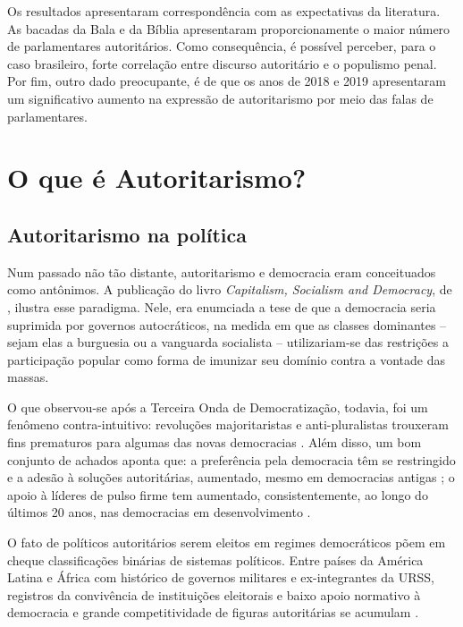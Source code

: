 \documentclass[
12pt,				%
openright,			%
twoside,			%
a4paper,			%
english,			%
french,				%
spanish,			%
brazil				%
]{abntex2}
\begin{document}
Os resultados apresentaram correspondência com as expectativas da literatura. As bacadas da Bala e da Bíblia apresentaram proporcionamente o maior número de parlamentares autoritários. Como consequência, é possível perceber, para o caso brasileiro, forte correlação entre discurso autoritário e o populismo penal. Por fim, outro dado preocupante, é de que os anos de 2018 e 2019 apresentaram um significativo aumento na expressão de autoritarismo por meio das falas de parlamentares.

\chapter{O que é Autoritarismo?}\label{referencial_teorico}

\section{Autoritarismo na política}

Num passado não tão distante, autoritarismo e democracia eram conceituados como antônimos. A publicação do livro \emph{Capitalism, Socialism and Democracy}, de , ilustra esse paradigma. Nele, era enumciada a tese de que a democracia seria suprimida por governos autocráticos, na medida em que  as classes dominantes -- sejam elas a burguesia ou a vanguarda socialista -- utilizariam-se das restrições a participação popular como forma de imunizar seu domínio contra a vontade das massas. 

O que observou-se após a Terceira Onda de Democratização, todavia, foi um fenômeno contra-intuitivo: revoluções majoritaristas e anti-pluralistas trouxeram fins prematuros para algumas das novas democracias \cite{lipset1993reflections}. Além disso, um bom conjunto de achados aponta que: a preferência pela democracia têm se restringido e a adesão à soluções autoritárias, aumentado, mesmo em democracias antigas \cite{foa2016democratic, foa2017signs, foa2017end}; o apoio à líderes de pulso firme tem aumentado, consistentemente, ao longo do últimos 20 anos, nas democracias em desenvolvimento \cite{voeten2016people}.

O fato de políticos autoritários serem eleitos em regimes democráticos põem em cheque classificações binárias de sistemas políticos. Entre países da América Latina e África com histórico de governos militares e ex-integrantes da URSS, registros da convivência de instituições eleitorais e baixo apoio normativo à democracia e grande competitividade de figuras autoritárias se acumulam \cite{booth1984political,seligson2003democracies, seligson2005feeding}. 
\end{document}
